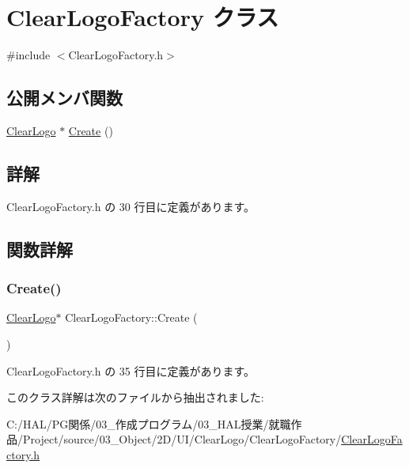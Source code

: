 \hypertarget{class_clear_logo_factory}{}\section{Clear\+Logo\+Factory クラス}
\label{class_clear_logo_factory}


{\ttfamily \#include $<$Clear\+Logo\+Factory.\+h$>$}

\subsection*{公開メンバ関数}
\begin{DoxyCompactItemize}
\item 
\mbox{\hyperlink{class_clear_logo}{Clear\+Logo}} $\ast$ \mbox{\hyperlink{class_clear_logo_factory_a98ea5747e5605f30d58be670ad4cac4a}{Create}} ()
\end{DoxyCompactItemize}


\subsection{詳解}


 Clear\+Logo\+Factory.\+h の 30 行目に定義があります。



\subsection{関数詳解}
\mbox{\label{class_clear_logo_factory_a98ea5747e5605f30d58be670ad4cac4a}} 
\subsubsection{\texorpdfstring{Create()}{Create()}}
{\footnotesize\ttfamily \mbox{\hyperlink{class_clear_logo}{Clear\+Logo}}$\ast$ Clear\+Logo\+Factory\+::\+Create (\begin{DoxyParamCaption}{ }\end{DoxyParamCaption})\hspace{0.3cm}{\ttfamily [inline]}}



 Clear\+Logo\+Factory.\+h の 35 行目に定義があります。



このクラス詳解は次のファイルから抽出されました\+:\begin{DoxyCompactItemize}
\item 
C\+:/\+H\+A\+L/\+P\+G関係/03\+\_\+作成プログラム/03\+\_\+\+H\+A\+L授業/就職作品/\+Project/source/03\+\_\+\+Object/2\+D/\+U\+I/\+Clear\+Logo/\+Clear\+Logo\+Factory/\mbox{\hyperlink{_clear_logo_factory_8h}{Clear\+Logo\+Factory.\+h}}\end{DoxyCompactItemize}
